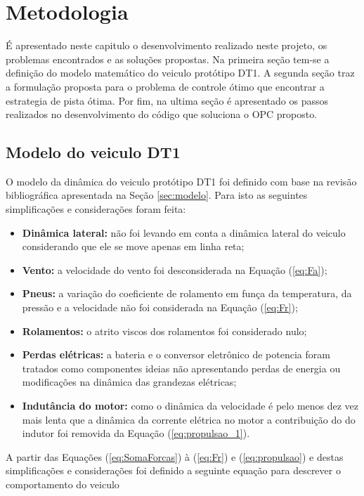 \chapter{Metodologia}
\label{chap:metodologia}
\thispagestyle{empty}

É apresentado neste capitulo o desenvolvimento realizado neste projeto, os problemas encontrados e as soluções propostas.
Na primeira seção tem-se a definição do modelo matemático do veiculo protótipo DT1. A segunda seção traz a formulação proposta para o problema de controle ótimo que encontrar
a estrategia de pista ótima. Por fim, na ultima seção é apresentado os passos realizados no desenvolvimento do código que soluciona o OPC proposto. 

\section{Modelo do veiculo DT1} 

O modelo da dinâmica do veiculo protótipo DT1 foi definido com base na revisão bibliográfica apresentada na Seção \ref{sec:modelo}. 
Para isto as seguintes simplificações e considerações foram feita:

\begin{itemize}
    \item \textbf{Dinâmica lateral:} não foi levando em conta a dinâmica lateral do veiculo considerando que ele se move apenas em linha reta; 
    \item \textbf{Vento:} a velocidade do vento foi desconsiderada na Equação (\ref{eq:Fa});
    \item \textbf{Pneus:} a variação do coeficiente de rolamento em funça da temperatura, da pressão e a velocidade não foi considerada na Equação (\ref{eq:Fr});
    \item \textbf{Rolamentos:} o atrito viscos dos rolamentos foi considerado nulo;
    \item \textbf{Perdas elétricas:} a bateria e o conversor eletrônico de potencia foram tratados como componentes ideias não apresentando 
        perdas de energia ou modificações na dinâmica das grandezas elétricas;
    \item \textbf{Indutância do motor:} como o dinâmica da velocidade é pelo menos dez vez mais lenta que a dinâmica da corrente elétrica no motor
        a contribuição do do indutor foi removida da Equação (\ref{eq:propulsao_1}).  
\end{itemize}

A partir das Equações (\ref{eq:SomaForcas}) à (\ref{eq:Fr}) e (\ref{eq:propulsao}) e destas simplificações e considerações foi definido a 
seguinte equação para descrever o comportamento do veiculo

